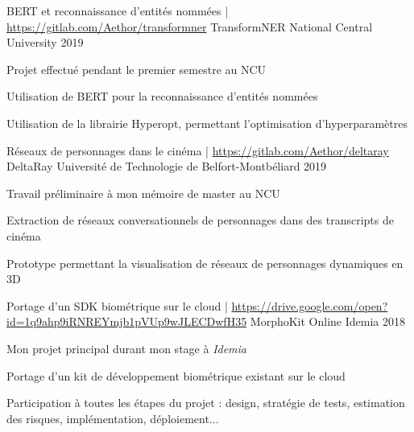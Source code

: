 \documentclass[12pt, a4paper]{awesome-cv}
\begin{document}
\begin{cventries}
  \cventry
  {BERT et reconnaissance d'entités nommées | \url{https://gitlab.com/Aethor/transformner}}
  {TransformNER}
  {National Central University}
  {2019}
  {
    \begin{cvitems}
      \item Projet effectué pendant le premier semestre au NCU
      \item Utilisation de BERT pour la reconnaissance d'entités nommées
      \item Utilisation de la librairie Hyperopt, permettant l'optimisation d'hyperparamètres
    \end{cvitems}
  }

  \cventry
  {Réseaux de personnages dans le cinéma | \url{https://gitlab.com/Aethor/deltaray}}
  {DeltaRay}
  {Université de Technologie de Belfort-Montbéliard}
  {2019}
  {
    \begin{cvitems}
      \item Travail préliminaire à mon mémoire de master au NCU
      \item Extraction de réseaux conversationnels de personnages dans des transcripts de cinéma
      \item Prototype permettant la visualisation de réseaux de personnages dynamiques en 3D
    \end{cvitems}
  }

  \cventry
  {Portage d'un SDK biométrique sur le cloud | \url{https://drive.google.com/open?id=1q9ahp9iRNREYmjb1pVUp9wJLECDwfH35}}
  {MorphoKit Online}
  {Idemia}
  {2018}
  {
    \begin{cvitems}
      \item Mon projet principal durant mon stage à \textit{Idemia}
      \item Portage d'un kit de développement biométrique existant sur le cloud
      \item Participation à toutes les étapes du projet : design, stratégie de tests, estimation des risques, implémentation, déploiement...
    \end{cvitems}
  }

\end{cventries}
\end{document}
